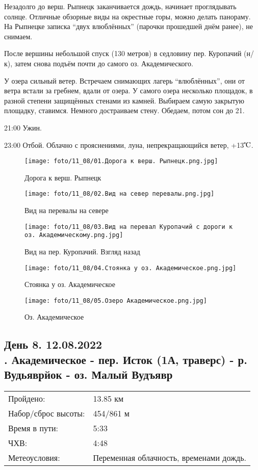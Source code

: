 Незадолго до верш. Рыпнецк заканчивается дождь, начинает проглядывать солнце. Отличные обзорные виды на окрестные горы,
можно делать панораму. На Рыпнецке записка ``двух влюблённых'' (парочки прошедшей днём ранее), не снимаем.

После вершины небольшой спуск (130 метров) в седловину пер. Куропачий (н/к), затем снова подъём почти
до самого оз. Академического.

У озера сильный ветер. Встречаем снимающих лагерь ``влюблённых'', они от ветра  встали за гребнем, вдали от озера.
У самого озера несколько площадок, в разной степени защищённых стенами из камней.
Выбираем самую закрытую площадку, ставимся. Немного достраиваем стену. Обедаем, потом сон до 21.

21:00 Ужин.

23:00 Отбой. Облачно с прояснениями, луна, непрекращающийся ветер, +13$\tccentigrade$.

\begin{figure}
    \centering
    \texttt{[image: foto/11\_08/01.Дорога к верш. Рыпнецк.png.jpg]}
    \caption{Дорога к верш. Рыпнецк}
\end{figure}

\begin{figure}
    \centering
    \texttt{[image: foto/11\_08/02.Вид на север перевалы.png.jpg]}
    \caption{Вид на перевалы на севере}
\end{figure}

\begin{figure}
    \centering
    \texttt{[image: foto/11\_08/03.Вид на перевал Куропачий с дороги к оз. Академическому.png.jpg]}
    \caption{Вид на пер. Куропачий. Взгляд назад}
\end{figure}

\begin{figure}
    \centering
    \texttt{[image: foto/11\_08/04.Стоянка у оз. Академическое.png.jpg]}
    \caption{Стоянка у оз. Академическое}
\end{figure}

\begin{figure}[H]
    \centering
    \texttt{[image: foto/11\_08/05.Озеро Академическое.png.jpg]}
    \caption{Оз. Академическое}
\end{figure}

\subsection{День 8. 12.08.2022\\
. Академическое - пер. Исток (1А, траверс) - р. Вудьяврйок - оз. Малый Вудъявр}
\begin{tabular}{l p{12cm}}
\hline
Пройдено: & 13.85 км\\
Набор/сброс высоты: & 454/861 м\\
Время в пути: & 5:33\\
ЧХВ: & 4:48\\
Метеоусловия: & Переменная облачность, временами дождь.\\
\hline
\end{tabular}

